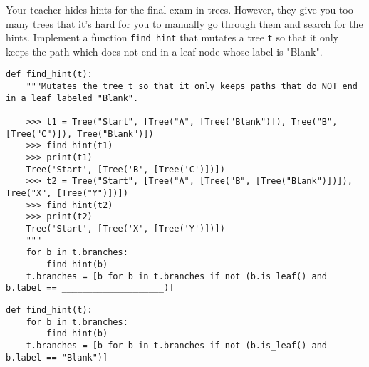 
\begin{blocksection}
    \question Your teacher hides hints for the final exam in trees. However, they give you too many trees that it's hard for you to manually go through them and search for the hints. Implement a function \lstinline$find_hint$ that mutates a tree \lstinline$t$ so that it only keeps the path which does not end in a leaf node whose label is "Blank".

    \begin{lstlisting}
def find_hint(t):
    """Mutates the tree t so that it only keeps paths that do NOT end in a leaf labeled "Blank".

    >>> t1 = Tree("Start", [Tree("A", [Tree("Blank")]), Tree("B", [Tree("C")]), Tree("Blank")])
    >>> find_hint(t1)
    >>> print(t1)
    Tree('Start', [Tree('B', [Tree('C')])])
    >>> t2 = Tree("Start", [Tree("A", [Tree("B", [Tree("Blank")])]), Tree("X", [Tree("Y")])])
    >>> find_hint(t2)
    >>> print(t2)
    Tree('Start', [Tree('X', [Tree('Y')])])
    """
    for b in t.branches:
        find_hint(b)
    t.branches = [b for b in t.branches if not (b.is_leaf() and b.label == ____________________)]
    \end{lstlisting}

    \begin{solution}[0.7in]
    \begin{lstlisting}
def find_hint(t):
    for b in t.branches:
        find_hint(b)
    t.branches = [b for b in t.branches if not (b.is_leaf() and b.label == "Blank")]
    \end{lstlisting}
    \end{solution}
\end{blocksection}
